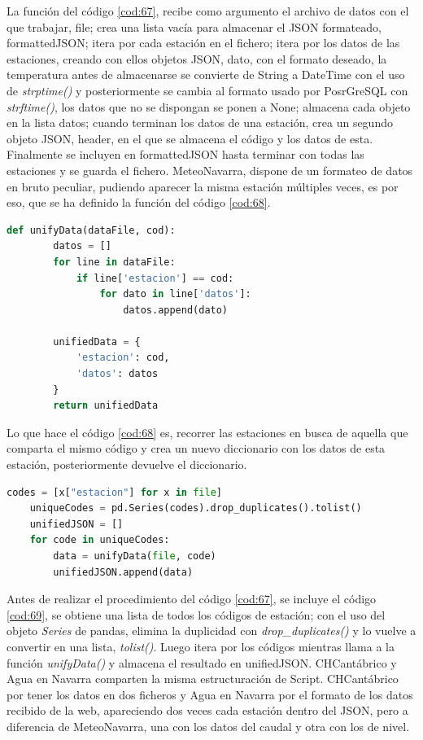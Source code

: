La función del código \ref{cod:67}, recibe como argumento el archivo de datos con el que trabajar, file; crea una lista vacía para almacenar el JSON formateado, formattedJSON; itera por cada estación en el fichero; itera por los datos de las estaciones, creando con ellos objetos JSON, dato, con el formato deseado, la temperatura antes de almacenarse se convierte de String a DateTime con el uso de \textit{strptime()} y posteriormente se cambia al formato usado por PosrGreSQL con \textit{strftime()}, los datos que no se dispongan se ponen a None; almacena cada objeto en la lista datos; cuando terminan los datos de una estación, crea un segundo objeto JSON, header, en el que se almacena el código y los datos de esta. Finalmente se incluyen en formattedJSON hasta terminar con todas las estaciones y se guarda el fichero.\newline
\newline
MeteoNavarra, dispone de un formateo de datos en bruto peculiar, pudiendo aparecer la misma estación múltiples veces, es por eso, que se ha definido la función del código \ref{cod:68}.

\begin{lstlisting}[language=Python, caption={Declaración función \textit{unifyData()} para el correcto funcionamiento del formateo de MeteoNavarra}, label=cod:68]
	def unifyData(dataFile, cod):
		datos = []
		for line in dataFile:
			if line['estacion'] == cod:
				for dato in line['datos']:
					datos.append(dato)
		
		unifiedData = {
			'estacion': cod,
			'datos': datos
		}
		return unifiedData
\end{lstlisting}

Lo que hace el código \ref{cod:68} es, recorrer las estaciones en busca de aquella que comparta el mismo código y crea un nuevo diccionario con los datos de esta estación, posteriormente devuelve el diccionario.

\begin{lstlisting}[language=Python, caption={Paso inicial en la función \textit{formatData()} de MeteoNavarra}, label=cod:69]
	codes = [x["estacion"] for x in file]
	uniqueCodes = pd.Series(codes).drop_duplicates().tolist()
	unifiedJSON = []
	for code in uniqueCodes:
		data = unifyData(file, code)
		unifiedJSON.append(data)
\end{lstlisting}

Antes de realizar el procedimiento del código \ref{cod:67}, se incluye el código \ref{cod:69}, se obtiene una lista de todos los códigos de estación; con el uso del objeto \textit{Series} de pandas, elimina la duplicidad con \textit{drop\_duplicates()} y lo vuelve a convertir en una lista, \textit{tolist()}. Luego itera por los códigos mientras llama a la función \textit{unifyData()} y almacena el resultado en unifiedJSON.\newline
\newline
CHCantábrico y Agua en Navarra comparten la misma estructuración de Script. CHCantábrico por tener los datos en dos ficheros y Agua en Navarra por el formato de los datos recibido de la web, apareciendo dos veces cada estación dentro del JSON, pero a diferencia de MeteoNavarra, una con los datos del caudal y otra con los de nivel.

